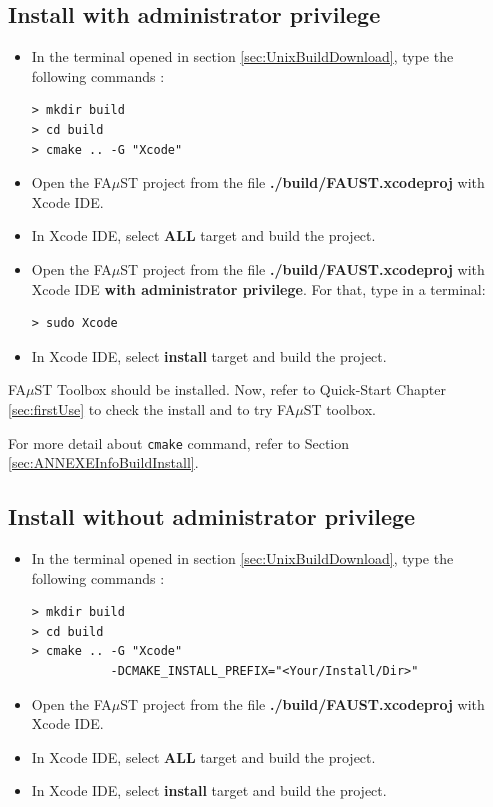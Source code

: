 \subsection{Install with administrator privilege}\label{sec:XcodeUnixBuildInstallAdmin}
 
\begin{itemize}
\item In the terminal opened in section 
\ref{sec:UnixBuildDownload}, type the following commands : 
\begin{lstlisting}
> mkdir build
> cd build
> cmake .. -G "Xcode"
\end{lstlisting}

\item Open the FA$\mu$ST project from the file \textbf{./build/FAUST.xcodeproj} with Xcode IDE. 
\item In Xcode IDE, select \textbf{ALL} target and build the project. 
\item Open the FA$\mu$ST project from the file \textbf{./build/FAUST.xcodeproj} with Xcode IDE \textbf{with administrator privilege}. For that, type in a terminal:
\begin{lstlisting}
> sudo Xcode
\end{lstlisting}
\item In Xcode IDE, select \textbf{install} target and build the project. 
\end{itemize}

FA$\mu$ST Toolbox should be installed. Now, refer to Quick-Start Chapter \ref{sec:firstUse} to check the install and to try FA$\mu$ST toolbox.

For more detail about \texttt{cmake} command, refer to Section \ref{sec:ANNEXEInfoBuildInstall}.


\subsection{Install without administrator privilege}\label{sec:XcodeUnixBuildInstallNOAdmin}
 
\begin{itemize}

\item In the terminal opened in section 
\ref{sec:UnixBuildDownload}, type the following commands : 
\begin{lstlisting}
> mkdir build
> cd build
> cmake .. -G "Xcode" 
		   -DCMAKE_INSTALL_PREFIX="<Your/Install/Dir>"
\end{lstlisting}

\item Open the FA$\mu$ST project from the file \textbf{./build/FAUST.xcodeproj} with Xcode IDE. 
\item In Xcode IDE, select \textbf{ALL} target and build the project. 
\item In Xcode IDE, select \textbf{install} target and build the project. 
\end{itemize}

